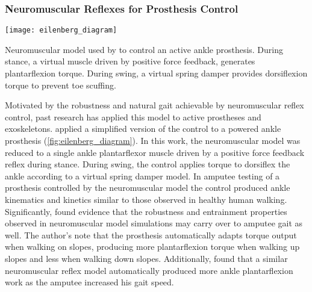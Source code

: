 \subsubsection{Neuromuscular Reflexes for Prosthesis
Control}\label{sec:back_neuromusc_prosthesis}
\begin{marginfigure}[1in]
    \centering
    \texttt{[image: eilenberg\_diagram]} \caption{Neuromuscular
    model used by \citet{eilenberg2010control} to control an active ankle
    prosthesis. During stance, a virtual muscle driven by positive force
    feedback, generates plantarflexion torque. During swing, a virtual spring
    damper provides dorsiflexion torque to prevent toe scuffing.}
    \label{fig:eilenberg_diagram}
\end{marginfigure}
Motivated by the robustness and natural gait achievable by neuromuscular
reflex control, past research has applied this model to active prostheses and
exoskeletons. \citet{eilenberg2010control} applied a simplified version of the
control to a powered ankle prosthesis (\cref{fig:eilenberg_diagram}). In this
work, the neuromuscular model was reduced to a single ankle plantarflexor muscle
driven by a positive force feedback reflex during stance. During swing, the
control applies torque to dorsiflex the ankle according to a virtual spring
damper model. In amputee testing of a prosthesis controlled by the neuromuscular
model the control produced ankle kinematics and kinetics similar to those
observed in healthy human walking. Significantly,
\citeauthor{eilenberg2010control} found evidence that the robustness and
entrainment properties observed in neuromuscular model simulations may carry
over to amputee gait as well. The author's note that the prosthesis
automatically adapts torque output when walking on slopes, producing more
plantarflexion torque when walking up slopes and less when walking down slopes.
Additionally, \citet{markowitz2011speed} found that a similar neuromuscular
reflex model automatically produced more ankle plantarflexion work as the
amputee increased his gait speed.

